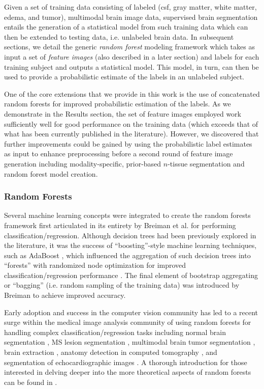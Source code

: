 \documentclass[final,5p,times,twocolumn]{elsarticle}
\begin{document}
Given a set of training data consisting of 
labeled (csf, gray matter, white matter, edema, and tumor),
multimodal brain image data, 
supervised brain segmentation entails the generation of a 
statistical model from such training data which can
then be extended to testing data, i.e. unlabeled 
brain data.  In subsequent sections, we detail the generic
{\it random forest} modeling framework which takes as input
a set of {\it feature images} (also described in a later section)
and labels for each training subject 
and outputs a statistical model.  This model, in turn, can then
be used to provide a probabilistic estimate of the labels in an
unlabeled subject. 

One of the core extensions that we provide in this work is
the use of concatenated random forests for improved probabilistic estimation
of the labels.
As we demonstrate in the Results section, the set of feature
images employed work sufficiently well for good performance
on the training data (which exceeds that of what has been
currently published in the literature).  However, we discovered
that further improvements could be gained by using the probabilistic 
label estimates as input to enhance preprocessing before a 
second round of feature image generation including 
modality-specific, prior-based $n$-tissue segmentation and 
random forest model creation. 

\subsubsection{Random Forests}

Several machine learning concepts were integrated to create 
the random forests framework first articulated in its entirety by Breiman
et al. \cite{breiman2001} for performing classification/regression.  
Although decision trees had been previously explored in the literature, 
it was the success of ``boosting''-style machine learning 
techniques, such as AdaBoost \cite{schapire1990,freund1997}, which influenced 
the aggregation of such decision trees into ``forests'' 
with randomized node optimization for improved
classification/regression performance \cite{ho1995,amit1997}.
The final element of bootstrap aggregating or ``bagging'' (i.e.
random sampling of the training data) was
introduced by Breiman \cite{breiman1996} to achieve improved
accuracy.  

Early adoption \cite{viola2005} and success in the
computer vision community
has led to a recent surge within the medical image analysis
community of using random forests for handling complex 
classification/regression tasks including
normal brain segmentation \cite{yi2009},
MS lesion segmentation \cite{geremia2011}, 
multimodal brain tumor segmentation
\cite{zikic2012,geremia2012}, brain extraction \cite{iglesias2010}, 
anatomy detection in computed tomography \cite{criminisi2013}, and
segmentation of echocardiographic images \cite{verhoek2011}.
A thorough introduction for those interested in delving deeper 
into the more theoretical aspects of random forests can be found
in \cite{criminisi2011}.
\end{document}
